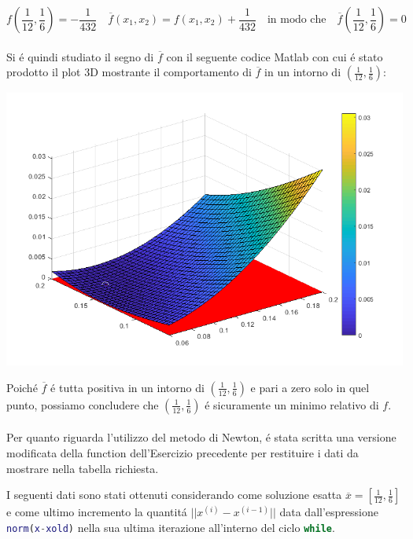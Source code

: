 \[
f(\frac{1}{12}, \frac{1}{6}) = -\frac{1}{432} \quad \overline{f}(x_1,x_2) = f(x_1,x_2) + \frac{1}{432} \quad \text{in modo che} \quad \overline{f}(\frac{1}{12}, \frac{1}{6}) = 0
\]
\\

\noindent Si \'e quindi studiato il segno di \(\overline{f} \) con il seguente codice Matlab con cui \'e stato prodotto il plot 3D mostrante il comportamento di \(\overline{f} \) in un intorno di \((\frac{1}{12}, \frac{1}{6})\):
\\


\begin{center}
	\includegraphics[scale=0.7]{cap3/3_11_sign.png}
\end{center}

\noindent Poich\'e \(\overline{f}\) \'e tutta positiva in un intorno di \((\frac{1}{12}, \frac{1}{6})\) e pari a zero solo in quel punto, possiamo concludere che \((\frac{1}{12}, \frac{1}{6})\) \'e sicuramente un minimo relativo di \(f\).
\\
\\
\noindent Per quanto riguarda l'utilizzo del metodo di Newton, \'e stata scritta una versione modificata della function dell'Esercizio precedente per restituire i dati da mostrare nella tabella richiesta.



\noindent I seguenti dati sono stati ottenuti considerando come soluzione esatta \(\overline{x} = [\frac{1}{12}, \frac{1}{6}]\) e come ultimo incremento la quantit\'a \(||x^{(i)} - x^{(i-1)}||\) data dall'espressione \lstinline[language=Matlab]{norm(x-xold)} nella sua ultima iterazione all'interno del ciclo \lstinline[language=Matlab]{while}.
\\

